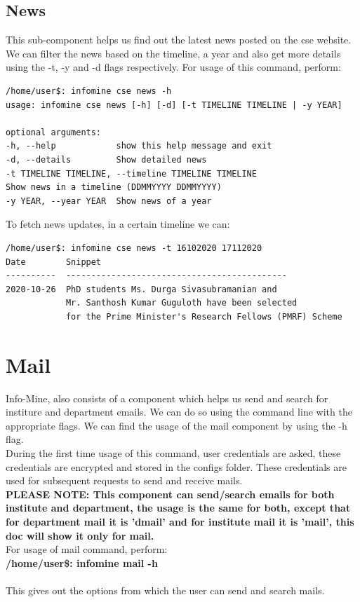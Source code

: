 \documentclass[12pt, a4paper]{article}
\begin{document}
\subsection{News}
This sub-component helps us find out the latest news posted on the cse website.
We can filter the news based on the timeline, a year and also get more details using the -t, -y and -d flags respectively.
For usage of this command, perform:
\begin{verbatim}
/home/user$: infomine cse news -h
usage: infomine cse news [-h] [-d] [-t TIMELINE TIMELINE | -y YEAR]

optional arguments:
-h, --help            show this help message and exit
-d, --details         Show detailed news
-t TIMELINE TIMELINE, --timeline TIMELINE TIMELINE
Show news in a timeline (DDMMYYYY DDMMYYYY)
-y YEAR, --year YEAR  Show news of a year   
\end{verbatim}
To fetch news updates, in a certain timeline we can:
\begin{verbatim}
/home/user$: infomine cse news -t 16102020 17112020
Date        Snippet
----------  --------------------------------------------
2020-10-26  PhD students Ms. Durga Sivasubramanian and 
            Mr. Santhosh Kumar Guguloth have been selected 
            for the Prime Minister's Research Fellows (PMRF) Scheme

\end{verbatim}
\section{Mail}
Info-Mine, also consists of a component which helps us send and search for institure and department emails. We can do so using the command line with the appropriate flags. We can find the usage of the mail component by using the -h flag.\\
During the first time usage of this command, user credentials are asked, these credentials are encrypted and stored in the configs folder. These credentials are used for subsequent requests to send and receive mails.\\
\textbf{PLEASE NOTE: This component can send/search emails for both institute and department, the usage is the same for both, except that for department mail it is 'dmail' and for institute mail it is 'mail', this doc will show it only for mail.}\\
For usage of mail command, perform:\\
\textbf{/home/user\$: infomine mail -h}\\
\\
This gives out the options from which the user can send and search mails.\\
\end{document}
